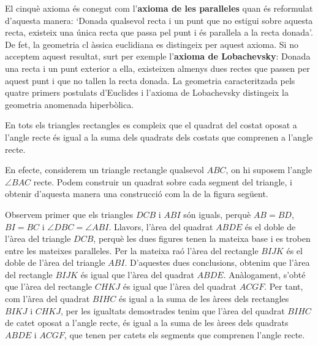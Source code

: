El cinqu\`{e} axioma \'{e}s conegut com l'\textbf{axioma de les
paral\textperiodcentered leles} quan \'{e}s reformulat d'aquesta manera:
`Donada qualsevol recta i un punt que no estigui sobre aquesta recta,
existeix una \'{u}nica recta que passa pel punt i \'{e}s
paral\textperiodcentered lela a la recta donada'. De fet, la geometria cl%
\`{a}ssica euclidiana es distingeix per aquest axioma. Si no acceptem aquest
resultat, surt per exemple l'\textbf{axioma de Lobachevsky}: Donada una
recta i un punt exterior a ella, existeixen almenys dues rectes que passen
per aquest punt i que no tallen la recta donada. La geometria caracteritzada
pels quatre primers postulats d'Euclides i l'axioma de Lobachevsky
distingeix la geometria anomenada hiperb\`{o}lica.

\begin{teorema}
En tots els triangles rectangles es compleix que el quadrat del costat
oposat a l'angle recte \'{e}s igual a la suma dels quadrats dels costats que
comprenen a l'angle recte.
\end{teorema}

\begin{prova}
En efecte, considerem un triangle rectangle qualsevol $ABC$, on hi suposem
l'angle $\angle BAC$ recte. Podem construir un quadrat sobre cada segment
del triangle, i obtenir d'aquesta manera una construcci\'{o} com la de la
figura seg\"{u}ent. 

Observem primer que els triangles $DCB$ i $ABI$ s\'{o}n iguals, perqu\`{e} $%
AB=BD$, $BI=BC$ i $\angle DBC=\angle ABI$. Llavors, l'\`{a}rea del quadrat $%
ABDE$ \'{e}s el doble de l'\`{a}rea del triangle $DCB$, perqu\`{e} les dues
figures tenen la mateixa base i es troben entre les mateixes
paral\textperiodcentered leles. Per la mateixa ra\'{o} l'\`{a}rea del
rectangle $BIJK$ \'{e}s el doble de l'\`{a}rea del triangle $ABI$.
D'aquestes dues conclusions, obtenim que l'\`{a}rea del rectangle $BIJK$
\'{e}s igual que l'\`{a}rea del quadrat $ABDE$. An\`{a}logament, s'obt\'{e}
que l'\`{a}rea del rectangle $CHKJ$ \'{e}s igual que l'\`{a}rea del quadrat $%
ACGF$. Per tant, com l'\`{a}rea del quadrat $BIHC$ \'{e}s igual a la suma de
les \`{a}rees dels rectangles $BIKJ$ i $CHKJ$, per les igualtats demostrades
tenim que l'\`{a}rea del quadrat $BIHC$ de catet oposat a l'angle recte,
\'{e}s igual a la suma de les \`{a}rees dels quadrats $ABDE$ i $ACGF$, que
tenen per catets els segments que comprenen l'angle recte.
\end{prova}

